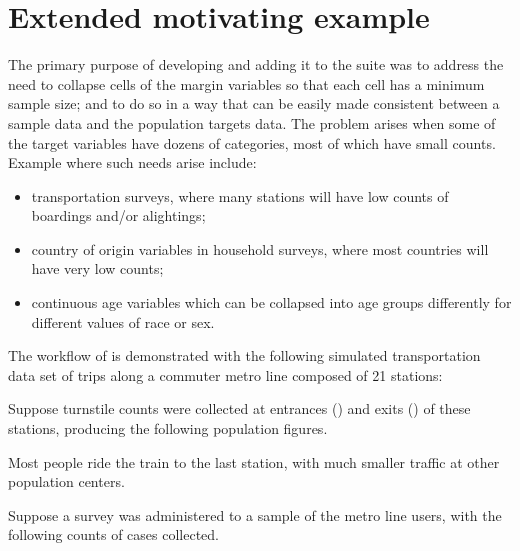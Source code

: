 
\section{Extended motivating example}
\label{subsec:example}

The primary purpose of developing  and adding it to the 
suite was to address the need
to collapse cells of the margin variables so that each cell has a minimum sample size;
and to do so in a way that can be easily made consistent between a sample data
and the population targets data. The problem arises when some of the target
variables have dozens of categories, most of which have small counts.
Example where such needs arise include:
\begin{itemize}
    \item transportation surveys, where many stations will have
        low counts of boardings and/or alightings;
    \item country of origin variables in household surveys,
        where most countries will have very low counts;
    \item continuous age variables which can be collapsed into
        age groups differently for different values of race or sex.
\end{itemize}

The workflow of  is demonstrated with the following
simulated transportation data set of trips along a commuter metro line composed of 21 stations:

\begin{stlog}
\nullskip
\end{stlog}

Suppose turnstile counts were collected at entrances () and exits () 
of these stations, producing the following population figures.

\label{page:station:daypart}

\noindent
\begin{stlog}
\nullskip
\end{stlog}

Most people ride the train to the last station, with much smaller traffic at other population centers.

Suppose a survey was administered to a sample of the metro line users, with the following counts
of cases collected.


